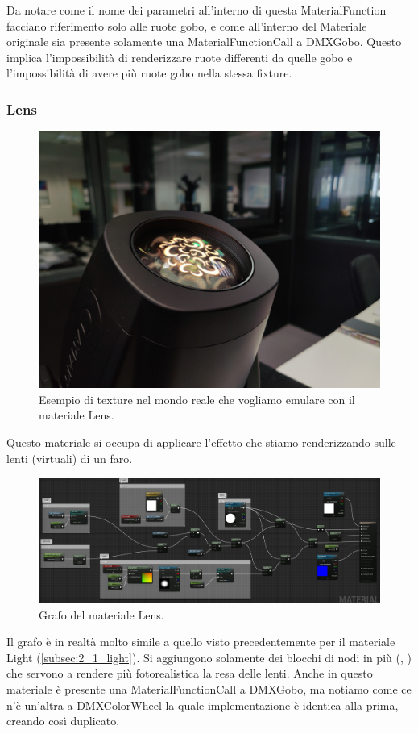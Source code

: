 \documentclass[main.tex]{subfiles}
\begin{document}
Da notare come il nome dei parametri all'interno di questa MaterialFunction facciano riferimento solo alle ruote gobo, e come all'interno del Materiale originale sia presente solamente una MaterialFunctionCall a DMXGobo. Questo implica l'impossibilità di renderizzare ruote differenti da quelle gobo e l'impossibilità di avere più ruote gobo nella stessa fixture.

\subsubsection{Lens}\label{subsec:2_1_lens}
\begin{figure}[H]
    \centering
    \includegraphics[width=0.5\linewidth]{img/renderingPipeline/Lens.jpg}
    \caption{Esempio di texture nel mondo reale che vogliamo emulare con il materiale Lens.}
    \label{fig:2_Lens}
\end{figure}
Questo materiale si occupa di applicare l'effetto che stiamo renderizzando sulle lenti (virtuali) di un faro.
\begin{figure}[H]
    \centering
    \includegraphics[width=1\linewidth]{img/renderingPipeline/LensMaterialFull.jpg}
    \caption{Grafo del materiale Lens.}
    \label{fig:2_lensGraphFull}
\end{figure}
\clearpage %
\noindent Il grafo è in realtà molto simile a quello visto precedentemente per il materiale Light (\ref{subsec:2_1_light}). Si aggiungono solamente dei blocchi di nodi in più (, ) che servono a rendere più fotorealistica la resa delle lenti. Anche in questo materiale è presente una MaterialFunctionCall a DMXGobo, ma notiamo come ce n'è un'altra a DMXColorWheel la quale implementazione è identica alla prima, creando così  duplicato.
\end{document}
